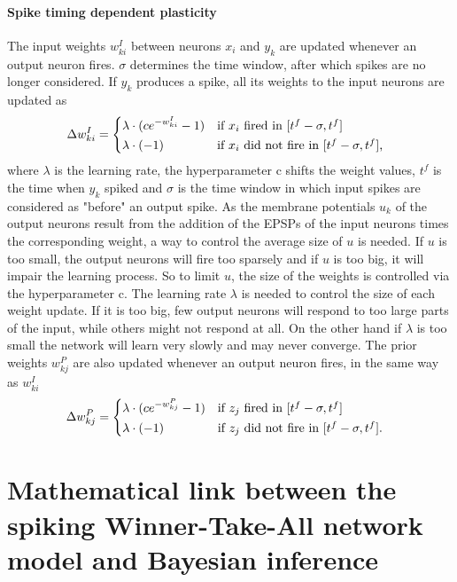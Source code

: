 \paragraph{Spike timing dependent plasticity}
The input weights $w^{I}_{ki}$ between neurons $x_i$ and $y_k$ are updated whenever an output neuron fires. $\sigma$ determines the time window, after which spikes are no longer considered. If $y_k$ produces a spike, all its weights to the input neurons are updated as
\begin{equation}
\label{deltawki}
\Delta w^{I}_{ki} = \begin{dcases*} \lambda \cdot (ce^{-w^{I}_{ki}} - 1) & if $x_{i}$ fired in $ [t^f - \sigma, t^f] $ \\
\lambda \cdot (-1) & \text{if $ x_i $ did not fire in $ [t^f - \sigma, t^f] $, } \end{dcases*}
\end{equation}
where $\lambda$ is the learning rate, the hyperparameter c shifts the weight values, $t^f$ is the time when $y_k$ spiked and $\sigma$ is the time window in which input spikes are considered as "before" an output spike. As the membrane potentials $u_k$ of the output neurons result from the addition of the EPSPs of the input neurons times the corresponding weight, a way to control the average size of $u$ is needed. If $u$ is too small, the output neurons will fire too sparsely and if $u$ is too big, it will impair the learning process. So to limit $u$, the size of the weights is controlled via the hyperparameter c. The learning rate $\lambda$ is needed to control the size of each weight update. If it is too big, few output neurons will respond to too large parts of the input, while others might not respond at all. On the other hand if $\lambda$ is too small the network will learn very slowly and may never converge.
The prior weights $w^{P}_{kj}$ are also updated whenever an output neuron fires, in the same way as $w^{I}_{ki}$
\begin{equation}
\label{deltawkj}
\Delta w^{P}_{kj} = \begin{dcases*} \lambda \cdot (ce^{-w^{P}_{kj}} - 1) & if $z_{j}$ fired in $ [t^f - \sigma, t^f] $ \\
\lambda \cdot (-1) & \text{if $ z_j $ did not fire in $ [t^f - \sigma, t^f] $. } \end{dcases*}
\end{equation}

\section{Mathematical link between the spiking Winner-Take-All network model and Bayesian inference}
\label{linkNetworkBayes}

